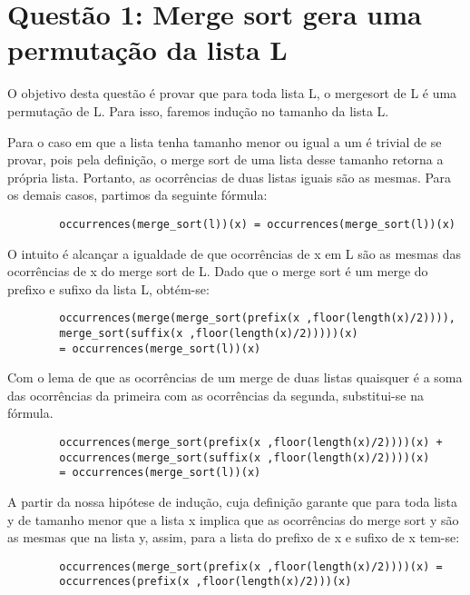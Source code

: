 \documentclass[12pt]{article}
\begin{document}
    \section{Questão 1: Merge sort gera uma permutação da lista L}
        
        O objetivo desta questão é provar que para toda lista L, o mergesort de L é uma permutação de L. Para isso, faremos indução no tamanho da lista L.
        
        Para o caso em que a lista tenha tamanho menor ou igual a um é trivial de se provar, pois pela definição, o merge sort de uma lista desse tamanho retorna a própria lista. Portanto, as ocorrências de duas listas iguais são as mesmas.
        Para os demais casos, partimos da seguinte fórmula:
        
        \begin{verbatim}
        occurrences(merge_sort(l))(x) = occurrences(merge_sort(l))(x)
        \end{verbatim}
        
        O intuito é alcançar a igualdade de que ocorrências de x em L são as mesmas das ocorrências de x do merge sort de L.
        Dado que o merge sort é um merge do prefixo e sufixo da lista L, obtém-se:
         
        \begin{verbatim}
        occurrences(merge(merge_sort(prefix(x ,floor(length(x)/2)))),
        merge_sort(suffix(x ,floor(length(x)/2)))))(x) 
        = occurrences(merge_sort(l))(x)
        \end{verbatim}
        
        Com o lema de que as ocorrências de um merge de duas listas quaisquer é a soma das ocorrências da primeira com as ocorrências da segunda, substitui-se na fórmula.
        
        \begin{verbatim}
        occurrences(merge_sort(prefix(x ,floor(length(x)/2))))(x) +
        occurrences(merge_sort(suffix(x ,floor(length(x)/2))))(x) 
        = occurrences(merge_sort(l))(x)
        \end{verbatim}
        
        A partir da nossa hipótese de indução, cuja definição garante que para toda lista y de tamanho menor que a lista x implica que as ocorrências do merge sort y são as mesmas que na lista y, assim, para a lista do prefixo de x e sufixo de x tem-se:
        
        \begin{verbatim}
        occurrences(merge_sort(prefix(x ,floor(length(x)/2))))(x) =
        occurrences(prefix(x ,floor(length(x)/2)))(x) 
        \end{verbatim}
        
\end{document}
